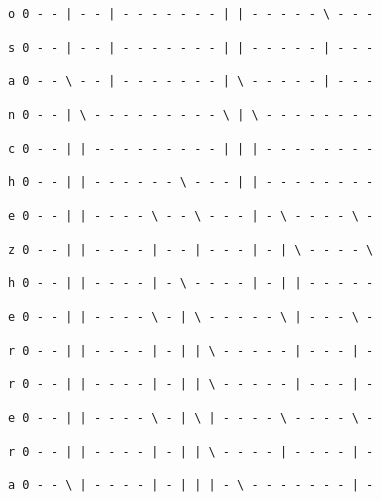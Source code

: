 \documentclass[11pt,a4paper]{article} %
\begin{document}
\texttt{o 0 - - | - - | - - - - - - - | | - - - - - \textbackslash{ }- - -}

\texttt{s 0 - - | - - | - - - - - - - | | - - - - - | - - -}

\texttt{a 0 - - \textbackslash{ }- - | - - - - - - - | \textbackslash{ }- - - - - | - - -}

\texttt{n 0 - - | \textbackslash{ }- - - - - - - - - \textbackslash{ }| \textbackslash{ }- - - - - - - -}

\texttt{c 0 - - | | - - - - - - - - - | | | - - - - - - - -}

\texttt{h 0 - - | | - - - - - - \textbackslash{ }- - - | | - - - - - - - -}

\texttt{e 0 - - | | - - - - \textbackslash{ }- - \textbackslash{ }- - - | - \textbackslash{ }- - - - \textbackslash{ }-} 

\texttt{z 0 - - | | - - - - | - - | - - - | - | \textbackslash{ }- - - - \textbackslash{ }}

\texttt{h 0 - - | | - - - - | - \textbackslash{ }- - - - | - | | - - - - -}

\texttt{e 0 - - | | - - - - \textbackslash{ }- | \textbackslash{ }- - - - - \textbackslash{ }| - - - \textbackslash{ }-}

\texttt{r 0 - - | | - - - - | - | | \textbackslash{ }- - - - - | - - - | -}

\texttt{r 0 - - | | - - - - | - | | \textbackslash{ }- - - - - | - - - | -}

\texttt{e 0 - - | | - - - - \textbackslash{ }- | \textbackslash{ }| - - - - \textbackslash{ }- - - - \textbackslash{ }-}

\texttt{r 0 - - | | - - - - | - | | \textbackslash{ }- - - - | - - - - | -}

\texttt{a 0 - - \textbackslash{ }| - - - - | - | | | - \textbackslash{ }- - - - - - - | -}



\normalsize



\end{document}
